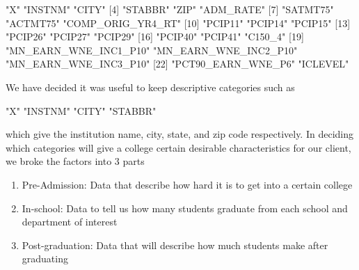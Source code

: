 \documentclass{article}
\begin{document}
\begin{Schunk}
\begin{Soutput}
 [1] "X"                    "INSTNM"               "CITY"                
 [4] "STABBR"               "ZIP"                  "ADM_RATE"            
 [7] "SATMT75"              "ACTMT75"              "COMP_ORIG_YR4_RT"    
[10] "PCIP11"               "PCIP14"               "PCIP15"              
[13] "PCIP26"               "PCIP27"               "PCIP29"              
[16] "PCIP40"               "PCIP41"               "C150_4"              
[19] "MN_EARN_WNE_INC1_P10" "MN_EARN_WNE_INC2_P10" "MN_EARN_WNE_INC3_P10"
[22] "PCT90_EARN_WNE_P6"    "ICLEVEL"             
\end{Soutput}
\end{Schunk}
We have decided it was useful to keep descriptive categories such as 
\begin{Schunk}
\begin{Soutput}
[1] "X"      "INSTNM" "CITY"   "STABBR"
\end{Soutput}
\end{Schunk}

which give the institution name, city, state, and zip code respectively.  In deciding which categories will give a college certain desirable characteristics for our client, we broke the factors into 3 parts

\begin{enumerate}
\item Pre-Admission: Data that describe how hard it is to get into a certain college
\item In-school: Data to tell us how many students graduate from each school and department of interest
\item Post-graduation: Data that will describe how much students make after graduating
\end{enumerate}
\end{document}
